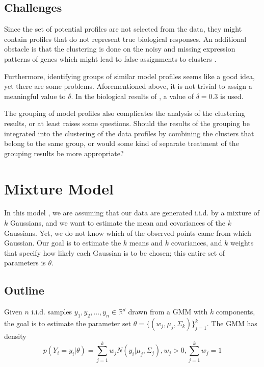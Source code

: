 \subsection{Challenges}
Since the set of potential profiles are not selected from the data, they might contain profiles that do not represent true biological responses. An additional obstacle is that the clustering is done on the noisy and missing expression patterns of genes which might lead to false assignments to clusters \cite{Sivriver2011}.

Furthermore, identifying groups of similar model profiles seems like a good idea, yet there are some problems. Aforementioned above, it is not trivial to assign a meaningful value to $\delta$. In the biological results of \cite{Ernst2005}, a value of $\delta =0.3$ is used. 

The grouping of model profiles also complicates the analysis of the clustering results, or at least raises some questions. Should the results of the grouping be integrated into the clustering of the data profiles by combining the clusters that belong to the same group, or would some kind of separate treatment of the grouping results be more appropriate?

\section{Mixture Model} \label{3.2}
In this model \cite{Bishop2013}, we are assuming that our data are generated i.i.d. by a mixture of $k$ Gaussians, and we want to estimate the mean and covariances of the $k$ Gaussians. Yet, we do not know which of the observed points came from which Gaussian. Our goal is to estimate the $k$ means and $k$ covariances, and $k$ weights that specify how likely each Gaussian is to be chosen; this entire set of parameters is $\theta$. 
\subsection{Outline}
Given $n$ i.i.d. samples $y_1, y_2, \dots, y_n \in \mathbb{R}^d$ drawn from a GMM with $k$ components, the goal is to estimate the parameter set $\theta = \{(w_j, \mu_j, \Sigma_k)\}_{j=1}^k$. 
The GMM has density 
\begin{equation*}
p(Y_i = y_i | \theta) = \sum_{j=1}^k w_j N(y_i|\mu_j, \Sigma_j), w_j>0, \sum_{j=1}^k w_j = 1
\end{equation*}

